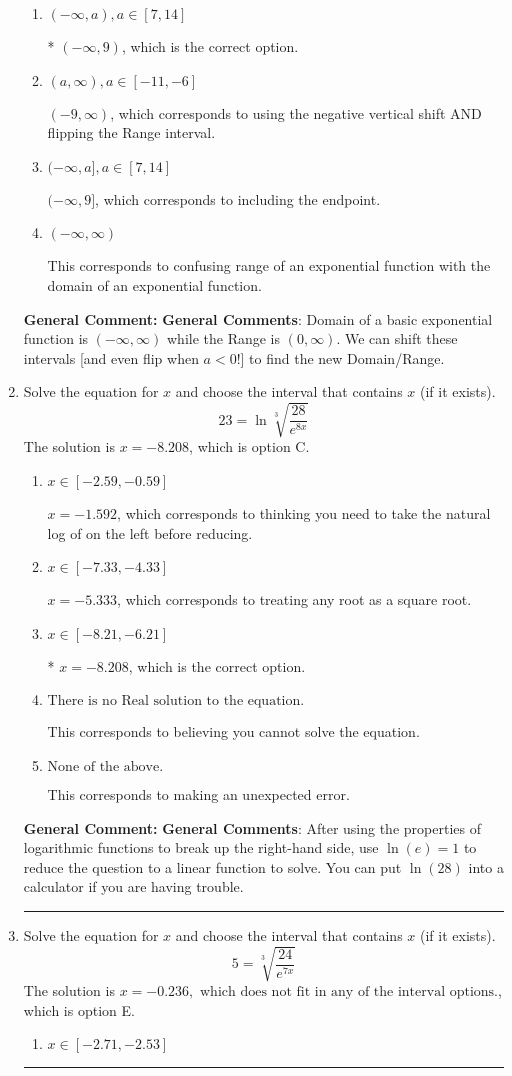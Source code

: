\documentclass{extbook}[14pt]
\newcommand{\litem}[1]{\item #1

\rule{\textwidth}{0.4pt}}
\begin{document}
\begin{enumerate}
{\begin{enumerate}[label=\Alph*.]
$[-9, \infty)$, which corresponds to using the negative vertical shift AND flipping the Range interval AND including the endpoint.
\item \( (-\infty, a), a \in [7, 14] \)

* $(-\infty, 9)$, which is the correct option.
\item \( (a, \infty), a \in [-11, -6] \)

$(-9, \infty)$, which corresponds to using the negative vertical shift AND flipping the Range interval.
\item \( (-\infty, a], a \in [7, 14] \)

$(-\infty, 9]$, which corresponds to including the endpoint.
\item \( (-\infty, \infty) \)

This corresponds to confusing range of an exponential function with the domain of an exponential function.
\end{enumerate}

\textbf{General Comment:} \textbf{General Comments}: Domain of a basic exponential function is $(-\infty, \infty)$ while the Range is $(0, \infty)$. We can shift these intervals [and even flip when $a<0$!] to find the new Domain/Range.
}
\litem{
 Solve the equation for $x$ and choose the interval that contains $x$ (if it exists).
\[  23 = \ln{\sqrt[3]{\frac{28}{e^{8x}}}} \]The solution is \( x = -8.208 \), which is option C.\begin{enumerate}[label=\Alph*.]
\item \( x \in [-2.59, -0.59] \)

$x = -1.592$, which corresponds to thinking you need to take the natural log of on the left before reducing.
\item \( x \in [-7.33, -4.33] \)

$x = -5.333$, which corresponds to treating any root as a square root.
\item \( x \in [-8.21, -6.21] \)

* $x = -8.208$, which is the correct option.
\item \( \text{There is no Real solution to the equation.} \)

This corresponds to believing you cannot solve the equation.
\item \( \text{None of the above.} \)

This corresponds to making an unexpected error.
\end{enumerate}

\textbf{General Comment:} \textbf{General Comments}: After using the properties of logarithmic functions to break up the right-hand side, use $\ln(e) = 1$ to reduce the question to a linear function to solve. You can put $\ln(28)$ into a calculator if you are having trouble.
}
\litem{
 Solve the equation for $x$ and choose the interval that contains $x$ (if it exists).
\[  5 = \sqrt[3]{\frac{24}{e^{7x}}} \]The solution is \( x = -0.236, \text{ which does not fit in any of the interval options.} \), which is option E.\begin{enumerate}[label=\Alph*.]
\item \( x \in [-2.71, -2.53] \)


\end{enumerate}}
\end{enumerate}
\end{document}
